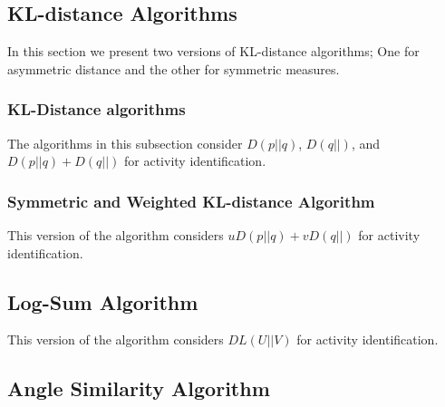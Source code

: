 \documentclass[10pt,myheadings]{IEEEtran}
\begin{document}
\subsection{KL-distance Algorithms}
\label{sec:DKDistanceAlgorithms}
In this section we present two versions of KL-distance algorithms; One for asymmetric distance and the other for symmetric measures.
%
\subsubsection{KL-Distance algorithms}
\label{sec:KLDistanceAlgorithm}
The algorithms in this subsection consider $D(p||q)$, $D(q||)$, and $D(p||q) + D(q||)$ for activity identification.
%
\subsubsection{Symmetric and Weighted KL-distance  Algorithm}
\label{sec:SymmetricAndWeightedKLDistanceAlgorithm}
This version of the algorithm considers  $uD(p||q) + vD(q||)$ for activity identification.
%
\subsection{Log-Sum Algorithm}
\label{sec:LogSumAlgorithm}

This version of the algorithm considers $DL(U||V)$ for activity identification.

%
\subsection{Angle Similarity Algorithm}
	\label{sec:AngleSimilarityAlgorithm}
	
\end{document}
